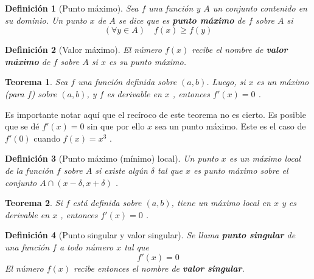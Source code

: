 \documentclass[12pt,a4paper]{extarticle}
\newtheorem{theorem}{Teorema}[section]
\newtheorem{mydef}{Definici\'on}[section]
\begin{document}
\begin{mydef}[Punto m\'aximo]
Sea \( f \) una funci\'on y \( A \) un conjunto contenido en su
dominio. Un punto  \( x \) de \( A \) se dice que es \textbf{punto
  m\'aximo} de \( f \) sobre \( A \)  si
\begin{equation}
(\forall y \in A) \quad f(x) \geq f(y)
\end{equation}
\end{mydef}

\begin{mydef}[Valor m\'aximo]
El n\'umero \( f(x) \) recibe el nombre de \textbf{valor m\'aximo} de
\( f \) sobre \( A \) si \( x \) es su punto m\'aximo.
\end{mydef}

\begin{theorem}
Sea \( f \) una funci\'on definida sobre \( (a,b) \). Luego, si \( x \)
es un m\'aximo (para \( f \)) sobre \( (a,b) \), y \( f \) es
derivable en \( x \) , entonces \( f'(x)=0 \) .
\end{theorem}
Es importante notar aqu\'i que el rec\'iroco de este teorema no es
cierto. Es posible que se d\'e \( f'(x)=0 \) sin que por ello \( x \)
sea un punto m\'aximo. Este es el caso de \( f'(0) \) cuando \(
f(x)=x^3 \) .

\begin{mydef}[Punto m\'aximo (m\'inimo) local]
Un punto \( x \) es un m\'aximo local de la funci\'on \( f \) sobre \(
A \) si existe alg\'un \( \delta \) tal que \( x \) es punto m\'aximo
sobre el conjunto \( A \cap (x-\delta, x+\delta) \) .
\end{mydef}

\begin{theorem}
Si \( f \) est\'a definida sobre \( (a,b) \), tiene un m\'aximo local
en \( x \) y es derivable en \( x \) , entonces \( f'(x)=0 \) .
\end{theorem}

\begin{mydef}[Punto singular y valor singular]
Se llama \textbf{punto singular} de una funci\'on \( f \)  a todo
n\'umero \( x \) tal que
\[ f'(x)=0 \]
El n\'umero \( f(x) \) recibe entonces el nombre de \textbf{valor singular}.
\end{mydef}
\end{document}
